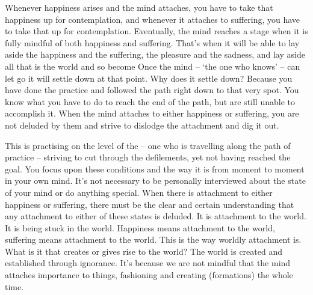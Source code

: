 Whenever happiness arises and the mind attaches, you have to take that happiness up for contemplation, and whenever it attaches to suffering, you have to take that up for contemplation. Eventually, the mind reaches a stage when it is fully mindful of both happiness and suffering. That's when it will be able to lay aside the happiness and the suffering, the pleasure and the sadness, and lay aside all that is the world and so become  Once the mind -- `the one who knows' -- can let go it will settle down at that point. Why does it settle down? Because you have done the practice and followed the path right down to that very spot. You know what you have to do to reach the end of the path, but are still unable to accomplish it. When the mind attaches to either happiness or suffering, you are not deluded by them and strive to dislodge the attachment and dig it out.

This is practising on the level of the  -- one who is travelling along the path of practice -- striving to cut through the defilements, yet not having reached the goal. You focus upon these conditions and the way it is from moment to moment in your own mind. It's not necessary to be personally interviewed about the state of your mind or do anything special. When there is attachment to either happiness or suffering, there must be the clear and certain understanding that any attachment to either of these states is deluded. It is attachment to the world. It is being stuck in the world. Happiness means attachment to the world, suffering means attachment to the world. This is the way worldly attachment is. What is it that creates or gives rise to the world? The world is created and established through ignorance. It's because we are not mindful that the mind attaches importance to things, fashioning and creating  (formations) the whole time.

